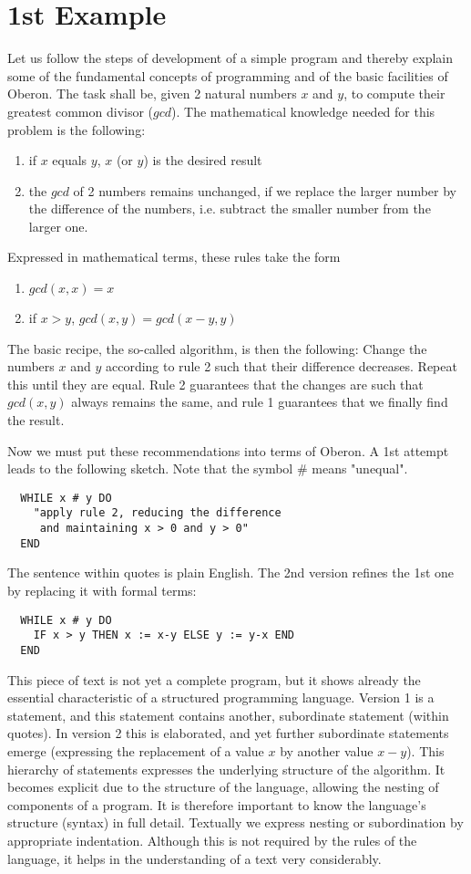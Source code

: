 \chapter{1st Example}
\label{ch:1ex}
Let us follow the steps of development of a simple program and thereby explain some of the
fundamental concepts of programming and of the basic facilities of Oberon. The task shall be,
given 2 natural numbers $x$ and $y$, to compute their greatest common divisor ($gcd$).
The mathematical knowledge needed for this problem is the following:
\begin{enumerate}
  \item if $x$ equals $y$, $x$ (or $y$) is the desired result
  \item the $gcd$ of 2 numbers remains unchanged, if we replace the larger number by the difference
    of the numbers, i.e. subtract the smaller number from the larger one.
\end{enumerate}
Expressed in mathematical terms, these rules take the form
\begin{enumerate}
  \item $gcd(x, x) = x$
  \item if $x>y$, $gcd(x, y) = gcd(x-y, y)$
\end{enumerate}

The basic recipe, the so-called algorithm, is then the following: Change the numbers $x$ and $y$
according to rule 2 such that their difference decreases. Repeat this until they are equal. Rule
2 guarantees that the changes are such that $gcd(x,y)$ always remains the same, and rule 1
guarantees that we finally find the result.

Now we must put these recommendations into terms of Oberon. A 1st attempt leads to the following
sketch. Note that the symbol \# means "unequal".
\begin{verbatim}
  WHILE x # y DO
    "apply rule 2, reducing the difference
     and maintaining x > 0 and y > 0"
  END
\end{verbatim}
The sentence within quotes is plain English. The 2nd version refines the 1st one by replacing
it with formal terms:
\begin{verbatim}
  WHILE x # y DO
    IF x > y THEN x := x-y ELSE y := y-x END
  END
\end{verbatim}
This piece of text is not yet a complete program, but it shows already the essential characteristic
of a structured programming language. Version 1 is a statement, and this statement contains another,
subordinate statement (within quotes). In version 2 this is elaborated, and yet further subordinate
statements emerge (expressing the replacement of a value $x$ by another value $x-y$). This hierarchy
of statements expresses the underlying structure of the algorithm. It becomes explicit due to the
structure of the language, allowing the nesting of components of a program. It is therefore important
to know the language's structure (syntax) in full detail. Textually we express nesting or
subordination by appropriate indentation. Although this is not required by the rules of the language,
it helps in the understanding of a text very considerably.

